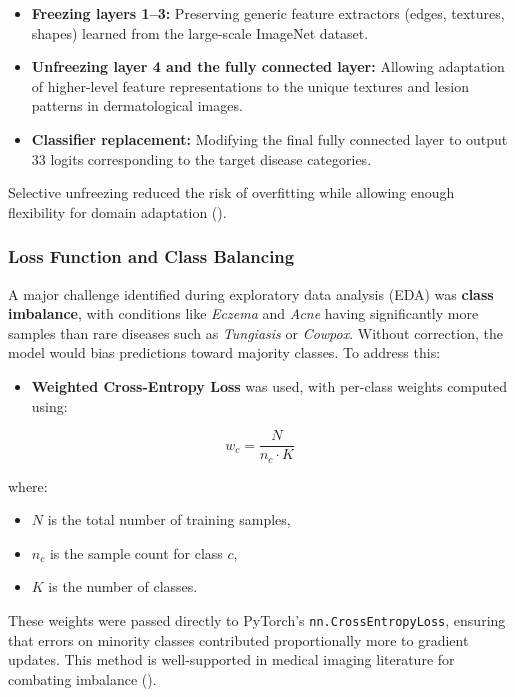 \documentclass[
  12pt,
  oneside]{article}
\providecommand{\tightlist}{%
  \setlength{\itemsep}{0pt}\setlength{\parskip}{0pt}}
\begin{document}
\begin{itemize}
\tightlist
\item
  \textbf{Freezing layers 1--3:} Preserving generic feature extractors
  (edges, textures, shapes) learned from the large-scale ImageNet
  dataset.
\item
  \textbf{Unfreezing layer 4 and the fully connected layer:} Allowing
  adaptation of higher-level feature representations to the unique
  textures and lesion patterns in dermatological images.
\item
  \textbf{Classifier replacement:} Modifying the final fully connected
  layer to output 33 logits corresponding to the target disease
  categories.
\end{itemize}

Selective unfreezing reduced the risk of overfitting while allowing
enough flexibility for domain adaptation
().

\subsubsection{Loss Function and Class
Balancing}\label{loss-function-and-class-balancing-1}

A major challenge identified during exploratory data analysis (EDA) was
\textbf{class imbalance}, with conditions like \emph{Eczema} and
\emph{Acne} having significantly more samples than rare diseases such as
\emph{Tungiasis} or \emph{Cowpox}. Without correction, the model would
bias predictions toward majority classes. To address this:

\begin{itemize}
\tightlist
\item
  \textbf{Weighted Cross-Entropy Loss} was used, with per-class weights
  computed using:
\end{itemize}

\[
w_c = \frac{N}{n_c \cdot K}
\]

where:

\begin{itemize}
\tightlist
\item
  \(N\) is the total number of training samples,
\item
  \(n_c\) is the sample count for class \(c\),
\item
  \(K\) is the number of classes.
\end{itemize}

These weights were passed directly to PyTorch's
\texttt{nn.CrossEntropyLoss}, ensuring that errors on minority classes
contributed proportionally more to gradient updates. This method is
well-supported in medical imaging literature for combating imbalance
().
\end{document}
